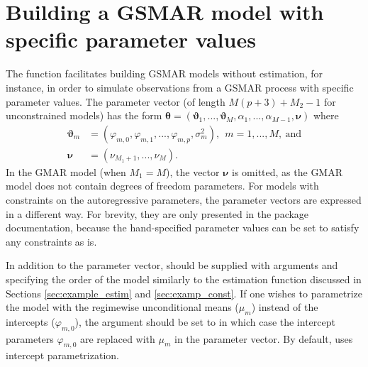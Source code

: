 \documentclass[nojss]{jss} %
\begin{document}
\section{Building a GSMAR model with specific parameter values}\label{sec:GSMAR}
The function  facilitates building GSMAR models without estimation, for instance, in order to simulate observations from a GSMAR process with specific parameter values. The parameter vector (of length $M(p+3)+M_2-1$ for unconstrained models) has the form $\boldsymbol{\theta} = (\boldsymbol{\vartheta}_1,...,\boldsymbol{\vartheta}_M,\alpha_1,...,\alpha_{M-1},\boldsymbol{\nu})$ where
\begin{align}
\boldsymbol{\vartheta}_m &= (\varphi_{m,0},\varphi_{m,1},...,\varphi_{m,p},\sigma^2_m),\ \ m=1,...,M, \ \text{and}  \\
\boldsymbol{\nu} &= (\nu_{M_1+1},...,\nu_M).
\end{align}
%
In the GMAR model (when $M_1=M$), the vector $\boldsymbol{\nu}$ is omitted, as the GMAR model does not contain degrees of freedom parameters. For models with constraints on the autoregressive parameters, the parameter vectors are expressed in a different way. For brevity, they are only presented in the package documentation, because the hand-specified parameter values can be set to satisfy any constraints as is.

In addition to the parameter vector,  should be supplied with arguments  and  specifying the order of the model similarly to the estimation function  discussed in Sections \ref{sec:example_estim} and \ref{sec:examp_const}. If one wishes to parametrize the model with the regimewise unconditional means ($\mu_m$) instead of the intercepts ($\varphi_{m,0}$), the argument  should be set to  in which case the intercept parameters $\varphi_{m,0}$ are replaced with $\mu_m$ in the parameter vector. By default,  uses intercept parametrization.
\end{document}
